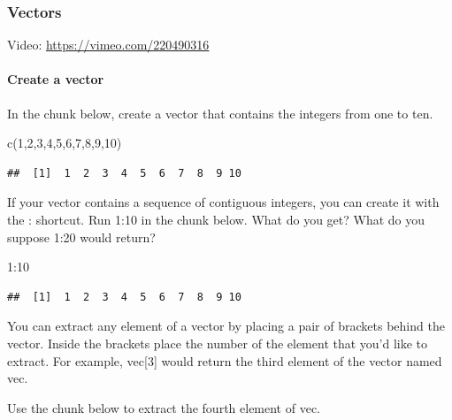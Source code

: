 \documentclass[
]{article}
\newenvironment{Shaded}{\begin{snugshade}}{\end{snugshade}}
\newcommand{\DecValTok}[1]{\textcolor[rgb]{0.00,0.00,0.81}{#1}}
\newcommand{\FunctionTok}[1]{\textcolor[rgb]{0.00,0.00,0.00}{#1}}
\newcommand{\NormalTok}[1]{#1}
\newcommand{\SpecialCharTok}[1]{\textcolor[rgb]{0.00,0.00,0.00}{#1}}
\begin{document}
\hypertarget{vectors}{%
\subsubsection{Vectors}\label{vectors}}

Video: \url{https://vimeo.com/220490316}

\hypertarget{create-a-vector}{%
\paragraph{Create a vector}\label{create-a-vector}}

In the chunk below, create a vector that contains the integers from one
to ten.

\begin{Shaded}
\begin{Highlighting}[]
\FunctionTok{c}\NormalTok{(}\DecValTok{1}\NormalTok{,}\DecValTok{2}\NormalTok{,}\DecValTok{3}\NormalTok{,}\DecValTok{4}\NormalTok{,}\DecValTok{5}\NormalTok{,}\DecValTok{6}\NormalTok{,}\DecValTok{7}\NormalTok{,}\DecValTok{8}\NormalTok{,}\DecValTok{9}\NormalTok{,}\DecValTok{10}\NormalTok{)}
\end{Highlighting}
\end{Shaded}

\begin{verbatim}
##  [1]  1  2  3  4  5  6  7  8  9 10
\end{verbatim}

If your vector contains a sequence of contiguous integers, you can
create it with the : shortcut. Run 1:10 in the chunk below. What do you
get? What do you suppose 1:20 would return?

\begin{Shaded}
\begin{Highlighting}[]
\DecValTok{1}\SpecialCharTok{:}\DecValTok{10}
\end{Highlighting}
\end{Shaded}

\begin{verbatim}
##  [1]  1  2  3  4  5  6  7  8  9 10
\end{verbatim}

You can extract any element of a vector by placing a pair of brackets
behind the vector. Inside the brackets place the number of the element
that you'd like to extract. For example, vec{[}3{]} would return the
third element of the vector named vec.

Use the chunk below to extract the fourth element of vec.
\end{document}
